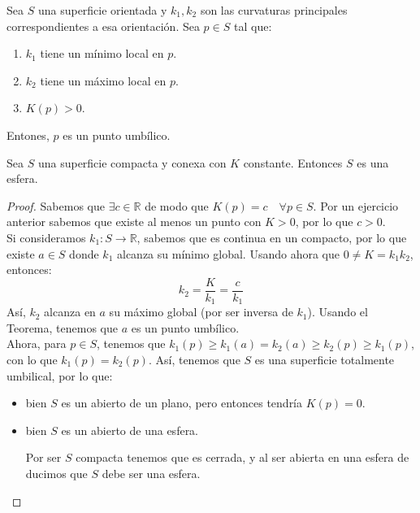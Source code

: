\begin{teo}
    Sea $S$ una superficie orientada y $k_1,k_2$ son las curvaturas principales correspondientes a esa orientación. Sea $p\in S$ tal que:
    \begin{enumerate}
        \item $k_1$ tiene un mínimo local en $p$.
        \item $k_2$ tiene un máximo local en $p$.
        \item $K(p)>0$.
    \end{enumerate}
    Entones, $p$ es un punto umbílico.
\end{teo}

\begin{coro}
    Sea $S$ una superficie compacta y conexa con $K$ constante. Entonces $S$ es una esfera.
    \begin{proof}
        Sabemos que $\exists c\in \mathbb{R}$ de modo que $K(p)=c\quad \forall p\in S$. Por un ejercicio anterior sabemos que existe al menos un punto con $K>0$, por lo que $c>0$.\\

        \noindent
        Si consideramos $k_1:S\to\mathbb{R}$, sabemos que es continua en un compacto, por lo que existe $a\in S$ donde $k_1$ alcanza su mínimo global. Usando ahora que $0 \neq K = k_1k_2$, entonces:
        \begin{equation*}
            k_2 = \frac{K}{k_1} = \frac{c}{k_1}
        \end{equation*}
        Así, $k_2$ alcanza en $a$ su máximo global (por ser inversa de $k_1$). Usando el Teorema, tenemos que $a$ es un punto umbílico.\\

        \noindent
        Ahora, para $p\in S$, tenemos que $k_1(p)\geq k_1(a) = k_2(a) \geq k_2(p) \geq k_1(p)$, con lo que $k_1(p) = k_2(p)$. Así, tenemos que $S$ es una superficie totalmente umbilical, por lo que: 
        \begin{itemize}
            \item bien $S$ es un abierto de un plano, pero entonces tendría $K(p) = 0$.
            \item bien $S$ es un abierto de una esfera. 

                Por ser $S$ compacta tenemos que es cerrada, y al ser abierta en una esfera de ducimos que $S$ debe ser una esfera.
        \end{itemize}
    \end{proof}
\end{coro}

